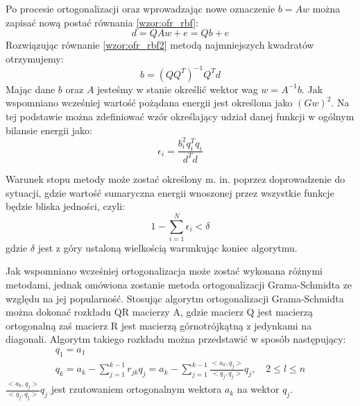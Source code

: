 Po procesie ortogonalizacji oraz wprowadzając nowe oznaczenie $b = Aw$ można zapisać nową postać równania \ref{wzor:ofr_rbf}:
\begin{equation}
	\label{wzor:ofr_rbf2}
	d = QAw + e = Qb + e
\end{equation}
Rozwiązując równanie \ref{wzor:ofr_rbf2} metodą najmniejszych kwadratów otrzymujemy:
\begin{equation}
	b = (QQ^T)^{-1}Q^Td
\end{equation}
Mając dane $b$ oraz $A$ jesteśmy w stanie określić wektor wag $w = A^{-1}b$.
Jak wspomniano wcześniej wartość pożądana energii jest określona jako $(Gw)^2$. Na tej podstawie można zdefiniować wzór określający udział danej funkcji w ogólnym bilansie energii jako:
\begin{equation}
	\epsilon_i = \frac{b_i^2q_i^Tq_i}{d^Td}
\end{equation}

Warunek stopu metody może zostać określony m. in. poprzez doprowadzenie do sytuacji, gdzie wartość sumaryczna energii wnoszonej przez wszystkie funkcje będzie bliska jedności, czyli:
\begin{equation}
	1 - \sum_{i=1}^N \epsilon_i < \delta
\end{equation}
gdzie $\delta$ jest z góry ustaloną wielkością warunkując koniec algorytmu.

Jak wspomniano wcześniej ortogonalizacja może zostać wykonana różnymi metodami, jednak omówiona zostanie metoda ortogonalizacji Grama-Schmidta ze względu na jej popularność. Stosując algorytm ortogonalizacji Grama-Schmidta można dokonać rozkładu QR macierzy A, gdzie macierz Q jest macierzą ortogonalną zaś macierz R jest macierzą górnotrójkątną z jedynkami na diagonali. Algorytm takiego rozkładu można przedstawić w sposób następujący\cite{Bernardelli}:
\begin{equation}
	\begin{array}{l}
	q_1 = a_1 \\
	q_k = a_k - \sum_{j=1}^{k-1} r_{jk}q_j = a_k - \sum_{j=1}^{k-1} \frac{<a_k,q_j>}{<q_j,q_j>} q_j, \quad 2 \leq l  \leq n 
\end{array}
\end{equation}
$\frac{<a_k,q_j>}{<q_j,q_j>} q_j$ jest rzutowaniem ortogonalnym wektora $a_k$ na wektor $q_j$.

